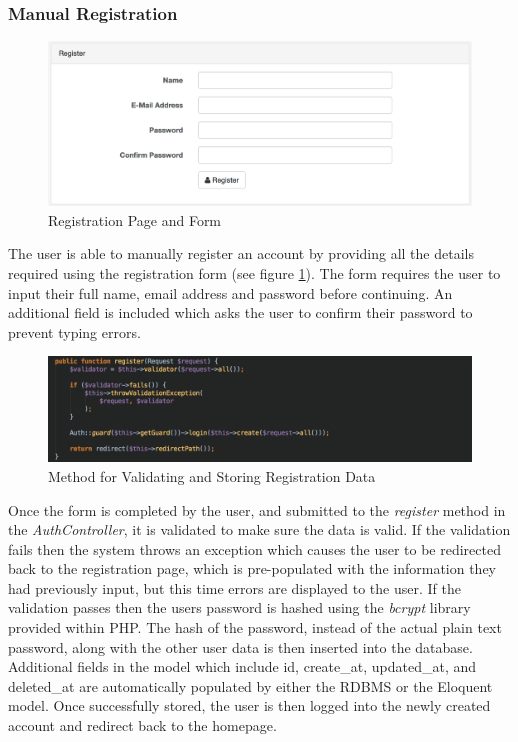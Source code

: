 \subsubsection{Manual Registration}
\begin{figure}[H]
	\centering
	\includegraphics[width=1.0\textwidth]{images/Frisk/Registration_Form}
	\caption{Registration Page and Form} \label{fig:Registration_Form}
\end{figure}

The user is able to manually register an account by providing all the details required using the registration form (see figure \ref{fig:Registration_Form}). The form requires the user to input their full name, email address and password before continuing. An additional field is included which asks the user to confirm their password to prevent typing errors.

\begin{figure}[H]
	\centering
	\includegraphics[width=1.0\textwidth]{images/Code/Register}
	\caption{Method for Validating and Storing Registration Data} \label{fig:Registration_Code}
\end{figure}

Once the form is completed by the user, and submitted to the \emph{register} method in the \emph{AuthController}, it is validated to make sure the data is valid. If the validation fails then the system throws an exception which causes the user to be redirected back to the registration page, which is pre-populated with the information they had previously input, but this time errors are displayed to the user. If the validation passes then the users password is hashed using the \emph{bcrypt} library provided within PHP. The hash of the password, instead of the actual plain text password, along with the other user data is then inserted into the database. Additional fields in the model which include id, create\_at, updated\_at, and deleted\_at are automatically populated by either the RDBMS or the Eloquent model. Once successfully stored, the user is then logged into the newly created account and redirect back to the homepage.

